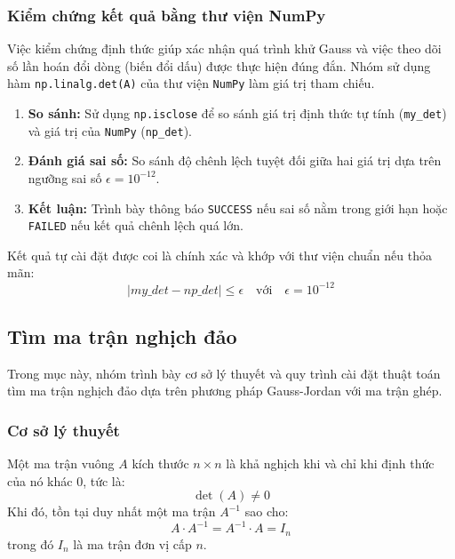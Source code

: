 \documentclass[12pt,a4paper]{article}
\begin{document}
\subsubsection{Kiểm chứng kết quả bằng thư viện NumPy}
Việc kiểm chứng định thức giúp xác nhận quá trình khử Gauss và việc theo dõi số lần hoán đổi dòng (biến đổi dấu) được thực hiện đúng đắn. Nhóm sử dụng hàm \texttt{np.linalg.det(A)} của thư viện \texttt{NumPy} làm giá trị tham chiếu.

\begin{enumerate}[label=\textbf{\alph*)}, leftmargin=*, align=left]
    \item \textbf{So sánh:} Sử dụng \texttt{np.isclose} để so sánh giá trị định thức tự tính (\texttt{my\_det}) và giá trị của \texttt{NumPy} (\texttt{np\_det}).
    \item \textbf{Đánh giá sai số:} So sánh độ chênh lệch tuyệt đối giữa hai giá trị dựa trên ngưỡng sai số $\epsilon = 10^{-12}$.
    \item \textbf{Kết luận:} Trình bày thông báo \texttt{SUCCESS} nếu sai số nằm trong giới hạn hoặc \texttt{FAILED} nếu kết quả chênh lệch quá lớn.
\end{enumerate}

\begin{infobox}
Kết quả tự cài đặt được coi là chính xác và khớp với thư viện chuẩn nếu thỏa mãn:
\begin{equation}
|my\_det - np\_det| \le \epsilon \quad \text{với} \quad \epsilon = 10^{-12}
\end{equation}
\end{infobox}

\subsection{Tìm ma trận nghịch đảo}
Trong mục này, nhóm trình bày cơ sở lý thuyết và quy trình cài đặt thuật toán tìm ma trận nghịch đảo dựa trên phương pháp Gauss-Jordan với ma trận ghép.

\subsubsection{Cơ sở lý thuyết}

\begin{infobox}
Một ma trận vuông $A$ kích thước $n \times n$ là khả nghịch khi và chỉ khi định thức của nó khác $0$, tức là:
\begin{equation}
\det(A) \neq 0
\end{equation}
Khi đó, tồn tại duy nhất một ma trận $A^{-1}$ sao cho:
\begin{equation}
A \cdot A^{-1} = A^{-1} \cdot A = I_n
\end{equation}
trong đó $I_n$ là ma trận đơn vị cấp $n$.
\end{infobox}
\end{document}
